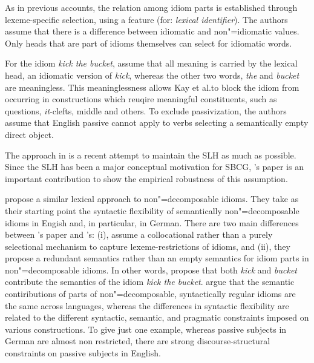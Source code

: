 \documentclass[output=paper]{langsci/langscibook}
\begin{document}
As in previous accounts, the relation among idiom parts is established through lexeme-specific selection, using a feature  (for: \emph{lexical identifier}). 
The authors assume that there is a difference between idiomatic and non"=idiomatic  values. 
Only heads that are part of idioms themselves can select for idiomatic words. 

For the idiom \emph{kick the bucket}, \cite{KSF2015a} assume that all meaning is carried by the lexical head, an idiomatic version of \emph{kick}, whereas the other two words, \emph{the} and \emph{bucket} are meaningless. 
This meaninglessness allows Kay et al.\@ to block the idiom from occurring in constructions which reuqire meaningful constituents, such as questions, \emph{it}-clefts, middle and others. 
To exclude passivization, the authors assume that English passive cannot apply to verbs selecting a semantically empty direct object.

The approach in \cite{KSF2015a} is a recent attempt to maintain the SLH as much as possible. 
Since the SLH has been a major conceptual motivation for SBCG, \citeauthor{KSF2015a}'s paper is an important contribution to show the empirical robustness of this assumption.

\cite{Bargmann:Sailer:18} propose a similar lexical approach to non"=de\-com\-pos\-able idioms. 
They take as their starting point the syntactic flexibility of semantically non"=decomposable idioms in Engish and, in particular, in German.
There are two main differences between \citeauthor{KSF2015a}'s paper and \citeauthor{Bargmann:Sailer:18}'s: (i), \citeauthor{Bargmann:Sailer:18} assume a collocational rather than a purely selectional mechanism to capture lexeme-restrictions of idioms, and (ii), they propose a redundant semantics rather than an empty semantics for idiom parts in non"=decomposable idioms. In other words, \cite{Bargmann:Sailer:18} propose that both \emph{kick} and \emph{bucket} contribute the semantics of the idiom \emph{kick the bucket}. 
\citeauthor{Bargmann:Sailer:18} argue that the semantic contiributions of parts of non"=decomposable, syntactically regular idioms are the same across languages, whereas the differences in syntactic flexibility are related to the different syntactic, semantic, and pragmatic constraints imposed on various constructions. 
To give just one example, whereas passive subjects in German are almost non restricted, there are strong discourse-structural constraints on passive subjects in English.
\end{document}
